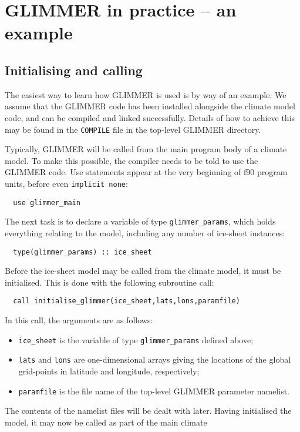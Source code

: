 \documentclass[11pt]{article}
\begin{document}
\section{GLIMMER in practice -- an example}

\subsection{Initialising and calling}

The easiest way to learn how GLIMMER is used is by way of an
example. We assume that the GLIMMER code has been installed alongside the
climate model code, and can be compiled and linked successfully. Details of
how to achieve this may be found in the \texttt{COMPILE} file in the top-level
GLIMMER directory. 

Typically, GLIMMER will be called from the main program body of a
climate model. To make this possible, the compiler needs to be told to use the
GLIMMER code. Use statements appear at the very beginning of f90 program
units, before even \texttt{implicit none}:
%
\begin{verbatim}
  use glimmer_main
\end{verbatim}
%
The next task is to declare a variable of type \texttt{glimmer\_params}, which
holds everything relating to the model, including any number of ice-sheet
instances:
%
\begin{verbatim}
  type(glimmer_params) :: ice_sheet
\end{verbatim}
%
Before the ice-sheet model may be called from the climate model, it must be
initialised. This is done with the following subroutine call:
%
\begin{verbatim}
  call initialise_glimmer(ice_sheet,lats,lons,paramfile)
\end{verbatim}
%
In this call, the arguments are as follows:
%
\begin{itemize}
\item \texttt{ice\_sheet} is the variable of type \texttt{glimmer\_params}
 defined above;
\item \texttt{lats} and \texttt{lons} are one-dimensional arrays giving the
  locations of the global grid-points in latitude and longitude, respectively; 
\item \texttt{paramfile} is the file name of the top-level GLIMMER parameter
  namelist.
\end{itemize}
%
The contents of the namelist files will be dealt with later. Having
initialised the model, it may now be called as part of the main climate
\end{document}
